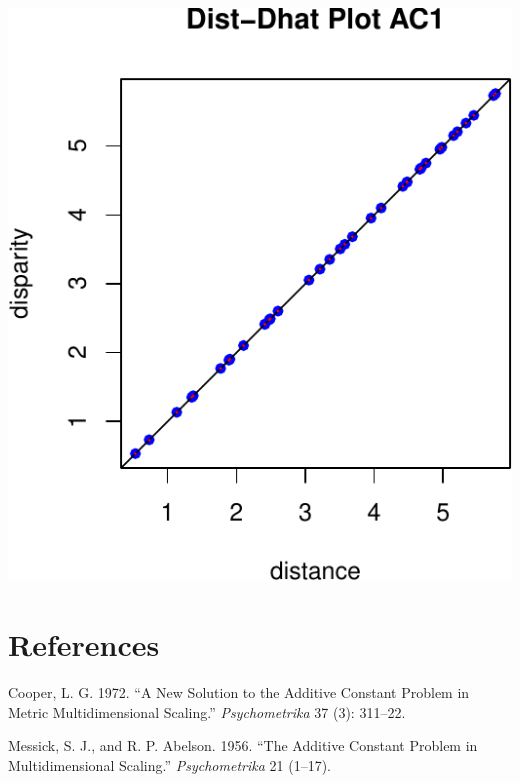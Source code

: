 \documentclass[
  12pt,
]{article}
\newlength{\cslhangindent}
\newenvironment{CSLReferences}[2] %
 {\begin{list}{}{%
  \setlength{\itemindent}{0pt}
  \setlength{\leftmargin}{0pt}
  \setlength{\parsep}{0pt}
  \ifodd #1
   \setlength{\leftmargin}{\cslhangindent}
   \setlength{\itemindent}{-1\cslhangindent}
  \fi
  \setlength{\itemsep}{#2\baselineskip}}}
 {\end{list}}
\begin{document}
\begin{center}\includegraphics{smacofAC_files/figure-latex/gruijterh11-3} \end{center}

\section*{References}\label{references}

\label{refs}
\begin{CSLReferences}{1}{0}
Cooper, L. G. 1972. {``{A New Solution to the Additive Constant Problem in Metric Multidimensional Scaling}.''} \emph{Psychometrika} 37 (3): 311--22.

Messick, S. J., and R. P. Abelson. 1956. {``{The Additive Constant Problem in Multidimensional Scaling}.''} \emph{Psychometrika} 21 (1--17).

\end{CSLReferences}
\end{document}
